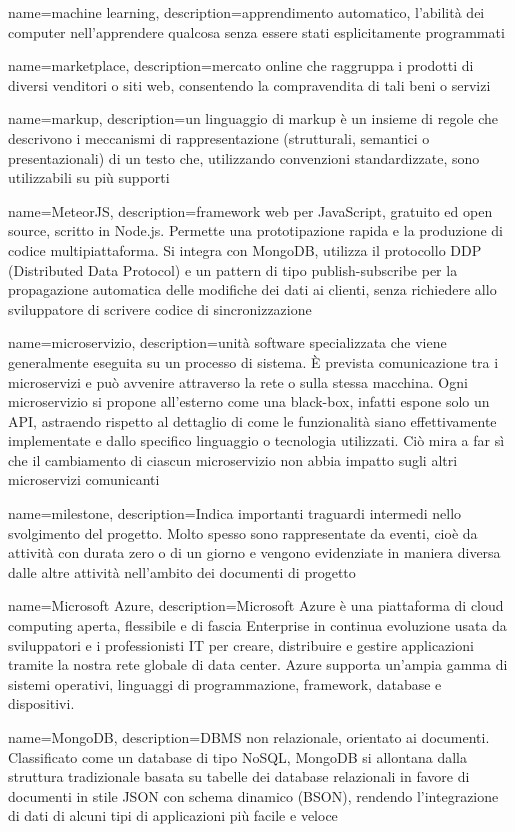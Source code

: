 

{
	name=machine learning,
	description={apprendimento automatico, l'abilità dei computer nell'apprendere qualcosa senza essere stati esplicitamente programmati}
}	

{
	name=marketplace,
	description={mercato online che raggruppa i prodotti di diversi venditori o siti web, consentendo la compravendita di tali beni o servizi}
}

{
	name=markup,
	description={un linguaggio di markup è un insieme di regole che descrivono i meccanismi di rappresentazione (strutturali, semantici o presentazionali) di un testo che, utilizzando convenzioni standardizzate, sono utilizzabili su più supporti}
}

{
	name=MeteorJS,
	description={framework web per JavaScript, gratuito ed open source, scritto in Node.js. Permette una prototipazione rapida e la produzione di codice multipiattaforma. Si integra con MongoDB, utilizza il protocollo DDP (Distributed Data Protocol) e un pattern di tipo publish-subscribe per la propagazione automatica delle modifiche dei dati ai clienti, senza richiedere allo sviluppatore di scrivere codice di sincronizzazione}
}		

{
	name=microservizio,
	description={unità software specializzata che viene generalmente eseguita su un processo di sistema. \MakeUppercase{è} prevista comunicazione tra i microservizi e può avvenire attraverso la rete o sulla stessa macchina. Ogni microservizio si propone all’esterno come una black-box, infatti espone solo un API, astraendo rispetto al dettaglio di come le funzionalità siano effettivamente implementate e dallo specifico linguaggio o tecnologia utilizzati. Ciò mira a far sì che il cambiamento di ciascun microservizio non abbia impatto sugli altri microservizi comunicanti}
}

{
	name=milestone,
	description={Indica importanti traguardi intermedi nello svolgimento del progetto. Molto spesso sono rappresentate da eventi, cio\`{e} da attivit\`{a} con durata zero o di un giorno e vengono evidenziate in maniera diversa dalle altre attivit\`{a} nell'ambito dei documenti di progetto}
}


{
	name=Microsoft Azure,
	description={Microsoft Azure è una piattaforma di cloud computing aperta, flessibile e di fascia Enterprise in continua evoluzione usata da sviluppatori e i professionisti IT per creare, distribuire e gestire applicazioni tramite la nostra rete globale di data center. Azure supporta un'ampia gamma di sistemi operativi, linguaggi di programmazione, framework, database e dispositivi.}
}			

{
	name=MongoDB,
	description={DBMS non relazionale, orientato ai documenti. Classificato come un database di tipo NoSQL, MongoDB si allontana dalla struttura tradizionale basata su tabelle dei database relazionali in favore di documenti in stile JSON con schema dinamico (BSON), rendendo l'integrazione di dati di alcuni tipi di applicazioni più facile e veloce}
}	

